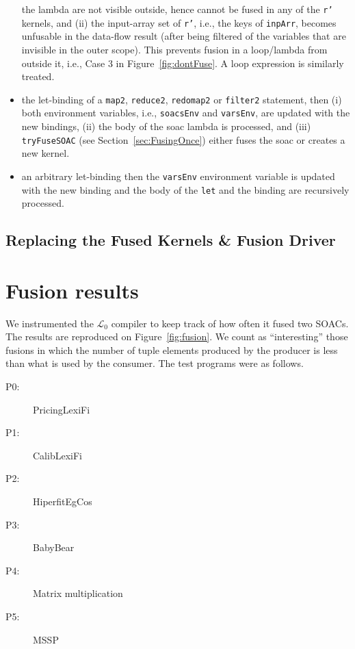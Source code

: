 \documentclass{sigplanconf}  %
\newcommand{\emp}[1]{\textcolor{DikuRed}{ #1}}
\newcommand{\LO}{$\mathcal{L}_0$}
\begin{document}
\begin{itemize}
                the lambda are not visible outside, hence cannot be fused in any of the
                {\tt r'} kernels, and (ii) the input-array set of {\tt r'}, i.e., the keys of 
                {\tt inpArr}, becomes unfusable in the data-flow result 
                (after being filtered of the variables that are invisible in the outer scope). 
            This prevents fusion in a loop/lambda from outside it, i.e., 
                \emp{Case 3} in Figure~\ref{fig:dontFuse}.
          A loop expression is similarly treated. 
    \item  the let-binding of a {\tt map2}, {\tt reduce2}, {\tt redomap2} or {\tt filter2} 
            statement, then (i) both environment variables, i.e., {\tt soacsEnv} and {\tt varsEnv}, 
            are updated with the new bindings, (ii) the body of the {\sc soac} 
            lambda is processed, and (iii) {\tt tryFuseSOAC} 
            (see Section~\ref{sec:FusingOnce}) either fuses the {\sc soac} 
            or creates a new kernel. 
    \item an arbitrary let-binding then the {\tt varsEnv} environment variable is
            updated with the new binding and the body of the {\tt let} and the
            binding are recursively processed.
            
             
             
\end{itemize}

\subsection{Replacing the Fused Kernels \& Fusion Driver}
\label{sec:fwdPass}


\section{Fusion results}
\label{sec:results}

We instrumented the \LO{} compiler to keep track of how often it fused
two SOACs.  The results are reproduced on Figure~\ref{fig:fusion}.  We
count as ``interesting'' those fusions in which the number of tuple
elements produced by the producer is less than what is used by the
consumer.  The test programs were as follows.

\begin{description}
\item[P0:] PricingLexiFi
\item[P1:] CalibLexiFi
\item[P2:] HiperfitEgCos
\item[P3:] BabyBear
\item[P4:] Matrix multiplication
\item[P5:] MSSP
\end{description}
\end{document}
